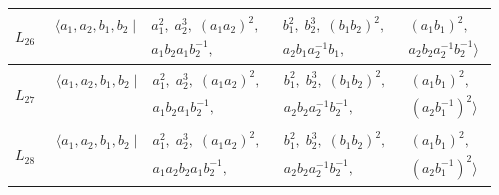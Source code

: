 \documentclass[dvipsnames]{article}
\theoremstyle{definition}
\theoremstyle{remark}
\begin{document}
\begin{longtable}{ |c|c| }
    $L_{26}$
    &
    \begin{minipage}{6cm}
        {
        \vspace{-2.5mm}
        \begin{align*}
            \big \langle
            a_1, a_2, b_1, b_2 \; \big | \;&
            a_1^2, \;
            a_2^3, \;
            (a_1 a_2)^2, && b_1^2, \;
            b_2^3, \; (b_1 b_2)^2, &&
            (a_1 b_1)^2, \\
            & a_1 b_2 a_1 b_2^{-1}, &&
            a_2 b_1 a_2^{-1} b_1, &&
            a_2 b_2 a_2^{-1} b_2^{-1}
            \big \rangle
        \end{align*}
        \vspace{-5mm}
        }
    \end{minipage}\\
    \hline

    $L_{27}$
    &
    \begin{minipage}{6cm}
        {
        \vspace{-2.5mm}
        \begin{align*}
            \big \langle
            a_1, a_2, b_1, b_2 \; \big | \;&
            a_1^2, \;
            a_2^3, \;
            (a_1 a_2)^2, &&
            b_1^2, \;
            b_2^3, \;
            (b_1 b_2)^2, &&
            (a_1 b_1)^2, \\
            & a_1 b_2 a_1 b_2^{-1}, &&
            a_2 b_2 a_2^{-1} b_2^{-1}, &&
            (a_2 b_1^{-1})^2
            \big \rangle
        \end{align*}
        \vspace{-5mm}
        }
    \end{minipage}\\
    \hline

    $L_{28}$
    &
    \begin{minipage}{6cm}
        {
        \vspace{-2.5mm}
        \begin{align*}
            \big \langle
            a_1, a_2, b_1, b_2 \; \big | \;&
            a_1^2, \;
            a_2^3, \;
            (a_1 a_2)^2, &&
            b_1^2, \;
            b_2^3, \;
            (b_1 b_2)^2, &&
            (a_1 b_1)^2, \\
            & a_1 a_2 b_2 a_1 b_2^{-1}, &&
            a_2 b_2 a_2^{-1} b_2^{-1}, &&
            (a_2 b_1^{-1})^2
            \big \rangle
        \end{align*}
        \vspace{-5mm}
        }
    \end{minipage}\\
    \hline


\end{longtable}
\end{document}
